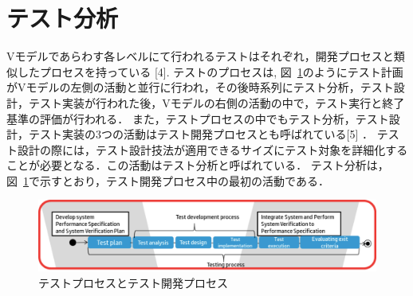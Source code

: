 \documentclass[a4paper,12pt]{jreport}
\begin{document}
\section{テスト分析}
Vモデルであらわす各レベルにて行われるテストはそれぞれ，開発プロセスと類似したプロセスを持っている [4].
テストのプロセスは, 図~\ref{fig:D-2-Fig2}のようにテスト計画がVモデルの左側の活動と並行に行われ，その後時系列にテスト分析，テスト設計，テスト実装が行われた後，Vモデルの右側の活動の中で，テスト実行と終了基準の評価が行われる．
また，テストプロセスの中でもテスト分析，テスト設計，テスト実装の3つの活動はテスト開発プロセスとも呼ばれている[5] ．
テスト設計の際には，テスト設計技法が適用できるサイズにテスト対象を詳細化することが必要となる．この活動はテスト分析と呼ばれている．
テスト分析は，図~\ref{fig:D-2-Fig2}で示すとおり，テスト開発プロセス中の最初の活動である．
\begin{figure}[h]
  \begin{center}
   \includegraphics[width=12cm]{./image/D-2-Fig2.png}
   \caption{テストプロセスとテスト開発プロセス}
   \label{fig:D-2-Fig2}
  \end{center}
\end{figure}
\end{document}
